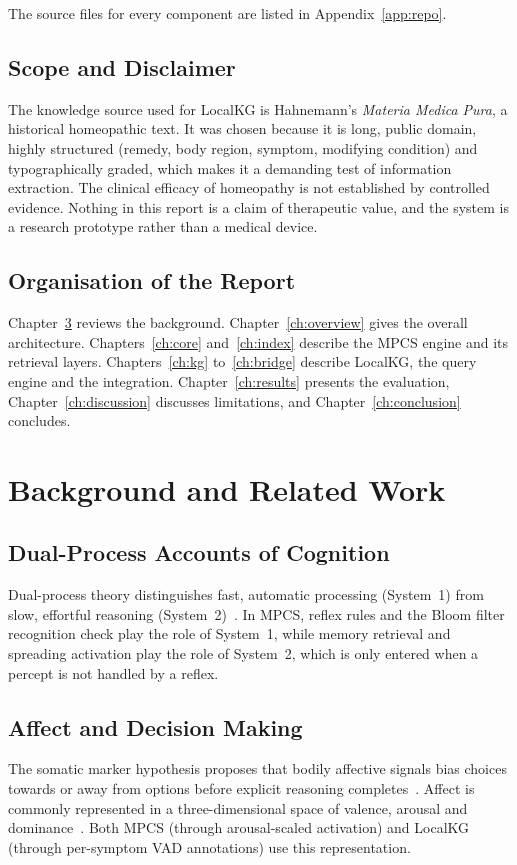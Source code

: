 \documentclass[12pt,a4paper,oneside]{report}
\begin{document}
The source files for every component are listed in Appendix~\ref{app:repo}.

\section{Scope and Disclaimer}
The knowledge source used for LocalKG is Hahnemann's \emph{Materia Medica Pura}, a historical homeopathic text. It was chosen because it is long, public domain, highly structured (remedy, body region, symptom, modifying condition) and typographically graded, which makes it a demanding test of information extraction. The clinical efficacy of homeopathy is not established by controlled evidence. Nothing in this report is a claim of therapeutic value, and the system is a research prototype rather than a medical device.

\section{Organisation of the Report}
Chapter~\ref{ch:background} reviews the background. Chapter~\ref{ch:overview} gives the overall architecture. Chapters~\ref{ch:core} and~\ref{ch:index} describe the MPCS engine and its retrieval layers. Chapters~\ref{ch:kg} to~\ref{ch:bridge} describe LocalKG, the query engine and the integration. Chapter~\ref{ch:results} presents the evaluation, Chapter~\ref{ch:discussion} discusses limitations, and Chapter~\ref{ch:conclusion} concludes.

\chapter{Background and Related Work}\label{ch:background}
\section{Dual-Process Accounts of Cognition}
Dual-process theory distinguishes fast, automatic processing (System~1) from slow, effortful reasoning (System~2)~\cite{kahneman2011}. In MPCS, reflex rules and the Bloom filter recognition check play the role of System~1, while memory retrieval and spreading activation play the role of System~2, which is only entered when a percept is not handled by a reflex.

\section{Affect and Decision Making}
The somatic marker hypothesis proposes that bodily affective signals bias choices towards or away from options before explicit reasoning completes~\cite{damasio1994,bechara1997}. Affect is commonly represented in a three-dimensional space of valence, arousal and dominance~\cite{mehrabian1996}. Both MPCS (through arousal-scaled activation) and LocalKG (through per-symptom VAD annotations) use this representation.
\end{document}

